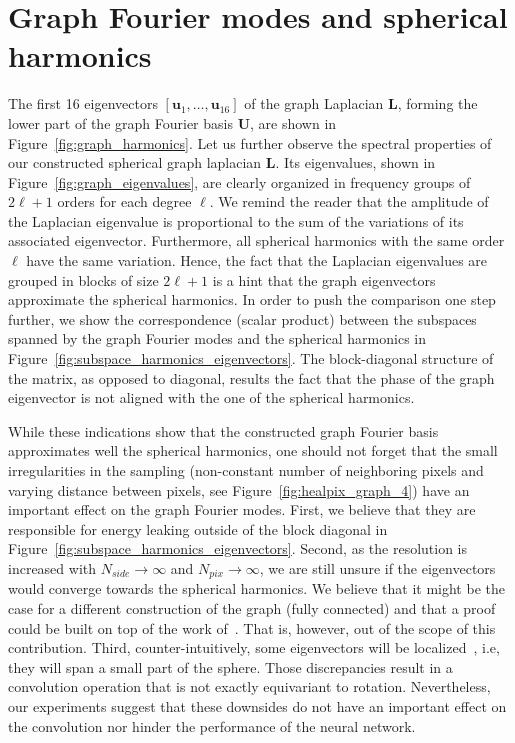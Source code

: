\documentclass[final,twocolumn,3p,times,sort&compress]{elsarticle}
\newcommand{\figref}[1]{Figure~\ref{fig:#1}}
\renewcommand{\b}[1]{{\bm{#1}}}   %
\newcommand{\1}{\b{1}}              %
\newcommand{\0}{\b{0}}              %
\renewcommand{\L}{\b{L}}
\newcommand{\U}{\b{U}}
\begin{document}
\appendix

\section{Graph Fourier modes and spherical harmonics}
\label{sec:comparison_spherical_harmonics}
The first 16 eigenvectors $[\b u_1, \ldots, \b u_{16}]$ of the graph Laplacian $\L$, forming the lower part of the graph Fourier basis $\U$, are shown in \figref{graph_harmonics}.
Let us further observe the spectral properties of our constructed spherical graph laplacian $\L$.
Its eigenvalues, shown in \figref{graph_eigenvalues}, are clearly organized in frequency groups of $2\ell + 1$ orders for each degree $\ell$.
We remind the reader that the amplitude of the Laplacian eigenvalue is proportional to the sum of the variations of its associated eigenvector. Furthermore, all spherical harmonics with the same order $\ell$ have the same variation. Hence, the fact that the Laplacian eigenvalues are grouped in blocks of size $2\ell + 1$ is a hint that the graph eigenvectors approximate the spherical harmonics.
In order to push the comparison one step further, we show the correspondence (scalar product) between the subspaces spanned by the graph Fourier modes and the spherical harmonics in \figref{subspace_harmonics_eigenvectors}.
The block-diagonal structure of the matrix, as opposed to diagonal, results the fact that the phase of the graph eigenvector is not aligned with the one of the spherical harmonics.

While these indications show that the constructed graph Fourier basis approximates well the spherical harmonics, one should not forget that the small irregularities in the sampling (non-constant number of neighboring pixels and varying distance between pixels, see \figref{healpix_graph_4}) have an important effect on the graph Fourier modes.
First, we believe that they are responsible for energy leaking outside of the block diagonal in \figref{subspace_harmonics_eigenvectors}.
Second, as the resolution is increased with $N_{side} \rightarrow \infty$ and $N_{pix} \rightarrow \infty$, we are still unsure if the eigenvectors would converge towards the spherical harmonics. We believe that it might be the case for a different construction of the graph (fully connected) and that a proof could be built on top of the work of~\cite{belkin2007convergence}. That is, however, out of the scope of this contribution.
Third, counter-intuitively, some eigenvectors will be localized~\citep{perraudin2018global}, i.e, they will span a small part of the sphere.
Those discrepancies result in a convolution operation that is not exactly equivariant to rotation.
Nevertheless, our experiments suggest that these downsides do not have an important effect on the convolution nor hinder the performance of the neural network.
\end{document}
